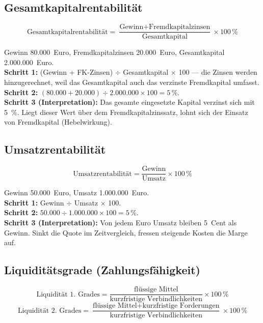 \documentclass[11pt, a4paper]{article}
\begin{document}
\subsection{Gesamtkapitalrentabilität}

\[
\mbox{Gesamtkapitalrentabilität} =
\frac{\mbox{Gewinn} + \mbox{Fremdkapitalzinsen}}{\mbox{Gesamtkapital}} \times 100\,\%
\]

\begin{beispiel}[title={Beispiel: Gesamtkapitalrentabilität}]
Gewinn 80.000~Euro, Fremdkapitalzinsen 20.000~Euro, Gesamtkapital 2.000.000~Euro.\\
\textbf{Schritt 1:} (Gewinn + FK-Zinsen) $\div$ Gesamtkapital $\times$ 100 --- die
Zinsen werden hinzugerechnet, weil das Gesamtkapital auch das verzinste Fremdkapital
umfasst.\\
\textbf{Schritt 2:} $(80.000 + 20.000) \div 2.000.000 \times 100 = 5\,\%$.\\
\textbf{Schritt 3 (Interpretation):} Das gesamte eingesetzte Kapital verzinst sich mit
5~\%. Liegt dieser Wert über dem Fremdkapitalzinssatz, lohnt sich der Einsatz von
Fremdkapital (Hebelwirkung).
\end{beispiel}

\subsection{Umsatzrentabilität}

\[
\mbox{Umsatzrentabilität} = \frac{\mbox{Gewinn}}{\mbox{Umsatz}} \times 100\,\%
\]

\begin{beispiel}[title={Beispiel: Umsatzrentabilität}]
Gewinn 50.000~Euro, Umsatz 1.000.000~Euro.\\
\textbf{Schritt 1:} Gewinn $\div$ Umsatz $\times$ 100.\\
\textbf{Schritt 2:} $50.000 \div 1.000.000 \times 100 = 5\,\%$.\\
\textbf{Schritt 3 (Interpretation):} Von jedem Euro Umsatz bleiben 5~Cent als Gewinn.
Sinkt die Quote im Zeitvergleich, fressen steigende Kosten die Marge auf.
\end{beispiel}

\subsection{Liquiditätsgrade (Zahlungsfähigkeit)}

\[
\mbox{Liquidität 1. Grades} =
\frac{\mbox{flüssige Mittel}}{\mbox{kurzfristige Verbindlichkeiten}} \times 100\,\%
\]
\[
\mbox{Liquidität 2. Grades} =
\frac{\mbox{flüssige Mittel} + \mbox{kurzfristige Forderungen}}
     {\mbox{kurzfristige Verbindlichkeiten}} \times 100\,\%
\]
\end{document}
